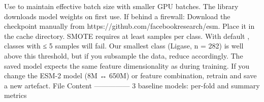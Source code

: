 \markdownRendererUlItem Use  to maintain effective batch size with smaller GPU batches.\markdownRendererUlItemEnd 
\markdownRendererUlEndTight \markdownRendererInterblockSeparator
{}
\markdownRendererSectionEnd \markdownRendererSectionBegin
{}\markdownRendererInterblockSeparator
{}The  library downloads model weights on first use. If behind a firewall:\markdownRendererInterblockSeparator
{}\markdownRendererOlBeginTight
{}Download the checkpoint manually from https://github.com/facebookresearch/esm.\markdownRendererOlItemEnd 
{}Place it in the  cache directory.\markdownRendererOlItemEnd 
\markdownRendererOlEndTight \markdownRendererInterblockSeparator
{}
\markdownRendererSectionEnd \markdownRendererSectionBegin
{}\markdownRendererInterblockSeparator
{}SMOTE requires at least  samples per class. With default , classes\markdownRendererSoftLineBreak
{}with ≤ 5 samples will fail. Our smallest class (Ligase, n = 282) is well above this threshold,\markdownRendererSoftLineBreak
{}but if you subsample the data, reduce  accordingly.\markdownRendererInterblockSeparator
{}
\markdownRendererSectionEnd \markdownRendererSectionBegin
{}\markdownRendererInterblockSeparator
{}The saved model expects the same feature dimensionality as during training. If you change\markdownRendererSoftLineBreak
{}the ESM-2 model (8M ↔ 650M) or feature combination, retrain and save a new artefact.\markdownRendererInterblockSeparator
{}\markdownRendererThematicBreak{}\markdownRendererInterblockSeparator
{}
\markdownRendererSectionEnd 
\markdownRendererSectionEnd \markdownRendererSectionBegin
{}\markdownRendererInterblockSeparator
{}\markdownRendererSectionBegin
{}\markdownRendererInterblockSeparator
{}\markdownRendererPipe{} File \markdownRendererPipe{} Content \markdownRendererPipe{}\markdownRendererSoftLineBreak
{}\markdownRendererPipe{}------\markdownRendererPipe{}---------\markdownRendererPipe{}\markdownRendererSoftLineBreak
{}\markdownRendererPipe{}  \markdownRendererPipe{} 3 baseline models: per-fold and summary metrics \markdownRendererPipe{}\markdownRendererSoftLineBreak
